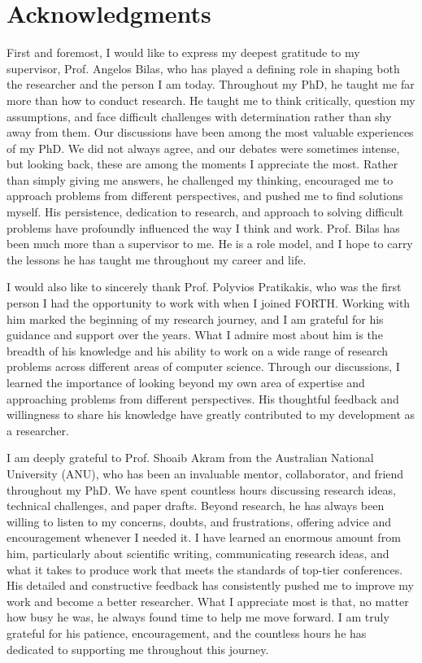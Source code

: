 \cleardoublepage


\selam

\chapter*{Acknowledgments}

First and foremost, I would like to express my deepest gratitude to my supervisor, Prof. Angelos Bilas, who has played a defining role in shaping both the researcher and the person I am today.
Throughout my PhD, he taught me far more than how to conduct research.
He taught me to think critically, question my assumptions, and face difficult challenges with determination rather than shy away from them.
Our discussions have been among the most valuable experiences of my PhD.
We did not always agree, and our debates were sometimes intense, but looking back, these are among the moments I appreciate the most.
Rather than simply giving me answers, he challenged my thinking, encouraged me to approach problems from different perspectives, and pushed me to find solutions myself.
His persistence, dedication to research, and approach to solving difficult problems have profoundly influenced the way I think and work.
Prof. Bilas has been much more than a supervisor to me.
He is a role model, and I hope to carry the lessons he has taught me throughout my career and life.

I would also like to sincerely thank Prof. Polyvios Pratikakis, who was the first person I had the opportunity to work with when I joined FORTH.
Working with him marked the beginning of my research journey, and I am grateful for his guidance and support over the years.
What I admire most about him is the breadth of his knowledge and his ability to work on a wide range of research problems across different areas of computer science.
Through our discussions, I learned the importance of looking beyond my own area of expertise and approaching problems from different perspectives.
His thoughtful feedback and willingness to share his knowledge have greatly contributed to my development as a researcher.

I am deeply grateful to Prof. Shoaib Akram from the Australian National University (ANU), who has been an invaluable mentor, collaborator, and friend throughout my PhD.
We have spent countless hours discussing research ideas, technical challenges, and paper drafts.
Beyond research, he has always been willing to listen to my concerns, doubts, and frustrations, offering advice and encouragement whenever I needed it.
I have learned an enormous amount from him, particularly about scientific writing, communicating research ideas, and what it takes to produce work that meets the standards of top-tier conferences.
His detailed and constructive feedback has consistently pushed me to improve my work and become a better researcher.
What I appreciate most is that, no matter how busy he was, he always found time to help me move forward.
I am truly grateful for his patience, encouragement, and the countless hours he has dedicated to supporting me throughout this journey.

